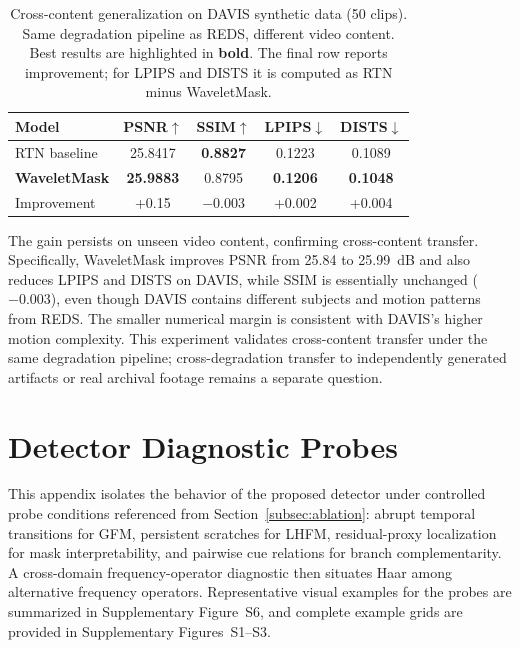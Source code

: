 {\begin{table}[H]
\caption{Cross-content generalization on DAVIS synthetic data (50 clips). Same degradation pipeline as REDS, different video content. Best results are highlighted in \textbf{bold}. The final row reports improvement; for LPIPS and DISTS it is computed as RTN minus WaveletMask.\label{tab:davis_cross_content}}
\begin{tabularx}{\textwidth}{lCCCC}
\toprule
\textbf{Model} & \textbf{PSNR$\uparrow$} & \textbf{SSIM$\uparrow$} & \textbf{LPIPS$\downarrow$} & \textbf{DISTS$\downarrow$} \\
\midrule
RTN baseline & 25.8417 & \textbf{0.8827} & 0.1223 & 0.1089 \\
\textbf{WaveletMask} & \textbf{25.9883} & 0.8795 & \textbf{0.1206} & \textbf{0.1048} \\
\midrule
Improvement & +0.15 & $-$0.003 & +0.002 & +0.004 \\
\bottomrule
\end{tabularx}
\end{table}

The gain persists on unseen video content, confirming cross-content transfer. Specifically, WaveletMask improves PSNR from 25.84 to 25.99~dB and also reduces LPIPS and DISTS on DAVIS, while SSIM is essentially unchanged ($-0.003$), even though DAVIS contains different subjects and motion patterns from REDS. The smaller numerical margin is consistent with DAVIS's higher motion complexity. This experiment validates cross-content transfer under the same degradation pipeline; cross-degradation transfer to independently generated artifacts or real archival footage remains a separate question.


\section{Detector Diagnostic Probes}\label{app:diagnostics}

This appendix isolates the behavior of the proposed detector under controlled probe conditions referenced from Section~\ref{subsec:ablation}: abrupt temporal transitions for GFM, persistent scratches for LHFM, residual-proxy localization for mask interpretability, and pairwise cue relations for branch complementarity. A cross-domain frequency-operator diagnostic then situates Haar among alternative frequency operators. Representative visual examples for the probes are summarized in Supplementary Figure~S6, and complete example grids are provided in Supplementary Figures~S1--S3.

}
